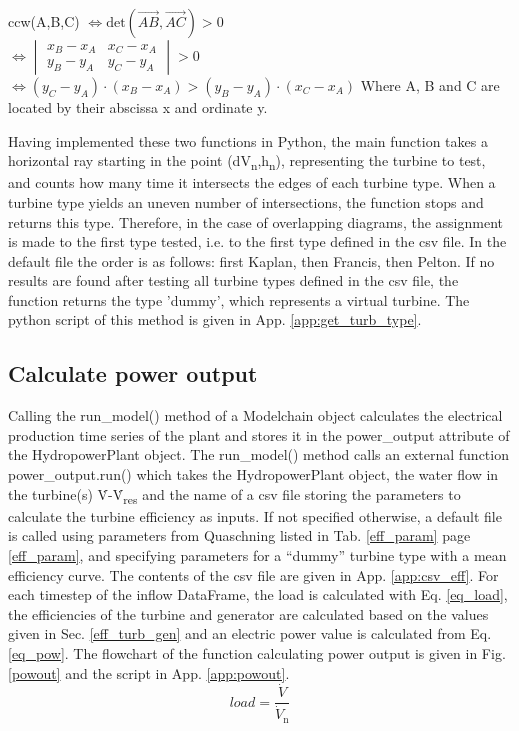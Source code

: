 ccw(A,B,C) \tabto{2.5cm}$\iff \mathrm{det}(\overrightarrow{AB},\overrightarrow{AC})>0$\newline \\
\tabto{2.5cm}$\iff \begin{vmatrix}x_B-x_A&x_C-x_A\\y_B-y_A&y_C-y_A\end{vmatrix}>0$\newline\\
\tabto{2.5cm}$\iff (y_C-y_A)\cdot(x_B-x_A) > (y_B-y_A)\cdot(x_C-x_A)$ \newline
Where A, B and C are located by their abscissa x and ordinate y. \newline

Having implemented these two functions in Python, the main function takes a horizontal ray starting in the point (dV\textsubscript{n},h\textsubscript{n}), representing the turbine to test, and counts how many time it intersects the edges of each turbine type. When a turbine type yields an uneven number of intersections, the function stops and returns this type. Therefore, in the case of overlapping diagrams, the assignment is made to the first type tested, i.e. to the first type defined in the csv file. In the default file the order is as follows: first Kaplan, then Francis, then Pelton. If no results are found after testing all turbine types defined in the csv file, the function returns the type 'dummy', which represents a virtual turbine. The python script of this method is given in App. \ref{app:get_turb_type}.

\subsection{Calculate power output}

Calling the run{\_}model() method of a Modelchain object calculates the electrical production time series of the plant and stores it in the power{\_}output attribute of the HydropowerPlant object. The run{\_}model() method calls an external function power{\_}output.run() which takes the HydropowerPlant object, the water flow in the turbine(s) \.{V}-\.{V}\textsubscript{res} and the name of a csv file storing the parameters to calculate the turbine efficiency as inputs. If not specified otherwise, a default file is called using parameters from Quaschning \cite{quaschning} listed in Tab. \ref{eff_param} page \ref{eff_param}, and specifying parameters for a ``dummy'' turbine type with a mean efficiency curve. The contents of the csv file are given in App. \ref{app:csv_eff}. \newline
For each timestep of the inflow DataFrame, the load is calculated with Eq. \eqref{eq_load}, the efficiencies of the turbine and generator are calculated based on the values given in Sec. \ref{eff_turb_gen} and an electric power value is calculated from Eq. \eqref{eq_pow}. The flowchart of the function calculating power output is given in Fig. \ref{powout} and the script in App. \ref{app:powout}.
\begin{equation}
 \label{eq_load}
 load = \frac{\dot{V}}{\dot{V}_\mathrm{n}}
\end{equation}

